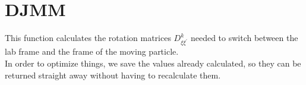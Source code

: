 \section{DJMM}
\label{sect:djmm}

\noindent This function calculates the rotation matrices $D^k_{\xi
\xi^\prime}$ needed to switch between the lab frame and the frame of the
moving particle.\\

\noindent In order to optimize things, we save the values already
calculated, so they can be returned straight away without having to
recalculate them.\\

